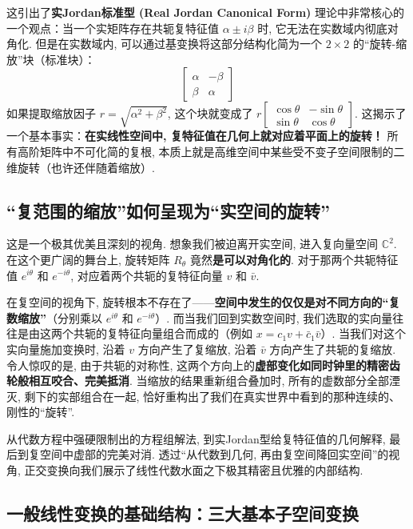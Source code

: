 \documentclass{ctexart}
\begin{document}
这引出了\textbf{实Jordan标准型 (Real Jordan Canonical Form)} 理论中非常核心的一个观点：当一个实矩阵存在共轭复特征值 $\alpha \pm i\beta$ 时, 它无法在实数域内彻底对角化. 但是在实数域内, 可以通过基变换将这部分结构化简为一个 $2 \times 2$ 的“旋转-缩放”块（标准块）：
$$
\begin{bmatrix} \alpha & -\beta \\ \beta & \alpha \end{bmatrix}
$$
如果提取缩放因子 $r = \sqrt{\alpha^2 + \beta^2}$, 这个块就变成了 $r \begin{bmatrix} \cos\theta & -\sin\theta \\ \sin\theta & \cos\theta \end{bmatrix}$. 
这揭示了一个基本事实：\textbf{在实线性空间中, 复特征值在几何上就对应着平面上的旋转！} 所有高阶矩阵中不可化简的复根, 本质上就是高维空间中某些受不变子空间限制的二维旋转（也许还伴随着缩放）.

\subsection{“复范围的缩放”如何呈现为“实空间的旋转”}

这是一个极其优美且深刻的视角. 想象我们被迫离开实空间, 进入复向量空间 $\mathbb{C}^2$. 在这个更广阔的舞台上, 旋转矩阵 $R_\theta$ 竟然\textbf{是可以对角化的}. 对于那两个共轭特征值 $e^{i\theta}$ 和 $e^{-i\theta}$, 对应着两个共轭的复特征向量 $v$ 和 $\bar{v}$.

在复空间的视角下, 旋转根本不存在了——\textbf{空间中发生的仅仅是对不同方向的“复数缩放”}（分别乘以 $e^{i\theta}$ 和 $e^{-i\theta}$）. 
而当我们回到实数空间时, 我们选取的实向量往往是由这两个共轭的复特征向量组合而成的（例如 $x = c_1 v + \bar{c}_1 \bar{v}$）. 
当我们对这个实向量施加变换时, 沿着 $v$ 方向产生了复缩放, 沿着 $\bar{v}$ 方向产生了共轭的复缩放. 
令人惊叹的是, 由于共轭的对称性, 这两个方向上的\textbf{虚部变化如同时钟里的精密齿轮般相互咬合、完美抵消}. 当缩放的结果重新组合叠加时, 所有的虚数部分全部湮灭, 剩下的实部组合在一起, 恰好重构出了我们在真实世界中看到的那种连续的、刚性的“旋转”.

从代数方程中强硬限制出的方程组解法, 到实Jordan型给复特征值的几何解释, 最后到复空间中虚部的完美对消. 透过“从代数到几何, 再由复空间降回实空间”的视角, 正交变换向我们展示了线性代数水面之下极其精密且优雅的内部结构.

\subsection{一般线性变换的基础结构：三大基本子空间变换}
\end{document}
